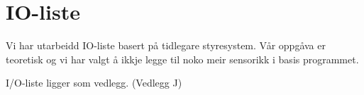 \section{IO-liste}
\thispagestyle{fancy}

Vi har utarbeidd IO-liste basert på tidlegare styresystem. \newline
Vår oppgåva er teoretisk og vi har valgt å ikkje legge til noko meir sensorikk i basis programmet.

I/O-liste ligger som vedlegg. (Vedlegg J)



%
%




